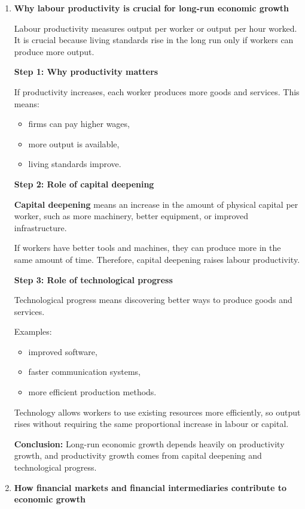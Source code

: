 \documentclass[12pt]{article}
\begin{document}
\begin{enumerate}[label=\textbf{\arabic*.}]
\item \textbf{Why labour productivity is crucial for long-run economic growth}

Labour productivity measures output per worker or output per hour worked. It is crucial because living standards rise in the long run only if workers can produce more output.

\textbf{Step 1: Why productivity matters}

If productivity increases, each worker produces more goods and services. This means:
\begin{itemize}
    \item firms can pay higher wages,
    \item more output is available,
    \item living standards improve.
\end{itemize}

\textbf{Step 2: Role of capital deepening}

\textbf{Capital deepening} means an increase in the amount of physical capital per worker, such as more machinery, better equipment, or improved infrastructure.

If workers have better tools and machines, they can produce more in the same amount of time. Therefore, capital deepening raises labour productivity.

\textbf{Step 3: Role of technological progress}

Technological progress means discovering better ways to produce goods and services.

Examples:
\begin{itemize}
    \item improved software,
    \item faster communication systems,
    \item more efficient production methods.
\end{itemize}

Technology allows workers to use existing resources more efficiently, so output rises without requiring the same proportional increase in labour or capital.

\textbf{Conclusion:} Long-run economic growth depends heavily on productivity growth, and productivity growth comes from capital deepening and technological progress.

\vspace{0.5em}

\item \textbf{How financial markets and financial intermediaries contribute to economic growth}


\end{enumerate}
\end{document}
